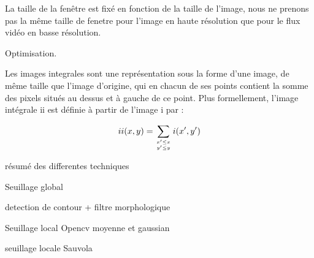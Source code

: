 La taille de la fenêtre est fixé en fonction de la taille de l'image, nous ne prenons pas la même taille de fenetre pour l'image en haute résolution que pour le flux vidéo en basse résolution.

Optimisation.

Les images integrales sont une représentation sous la forme d'une image, de même taille que l'image d'origine, qui en chacun de ses points contient la somme des pixels situés au dessus et à gauche de ce point. Plus formellement, l'image intégrale ii est définie à partir de l'image i par : 

\begin{equation}
	ii(x,y) = \sum_{x' \leq x  \atop y' \leq y } i(x',y')
\end{equation}







résumé des differentes techniques 


Seuillage global

detection de contour + filtre morphologique 
     
Seuillage local Opencv moyenne et gaussian

seuillage locale Sauvola
